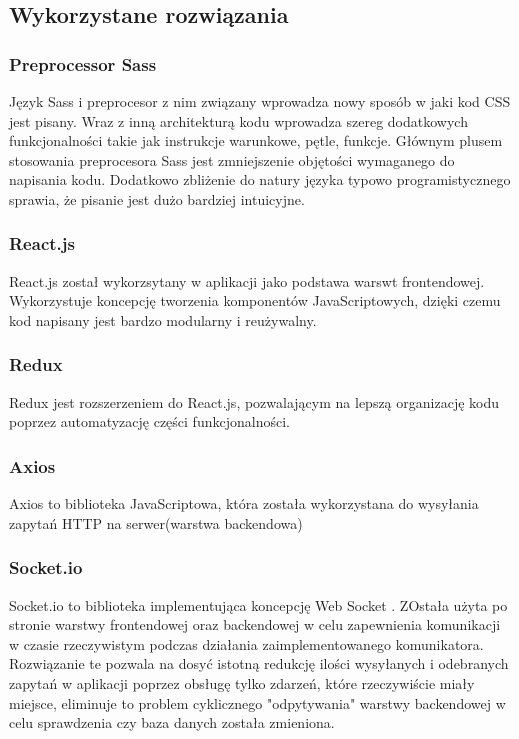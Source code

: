 \documentclass[eng,printmode]{mgr}
\begin{document}
\subsection{Wykorzystane rozwiązania}

\subsubsection{Preprocessor Sass}
Język Sass i preprocesor z nim związany \cite {SASS} wprowadza nowy sposób w jaki kod CSS jest pisany. Wraz z inną architekturą kodu wprowadza szereg dodatkowych funkcjonalności takie jak instrukcje warunkowe, pętle, funkcje. Głównym plusem stosowania preprocesora Sass jest zmniejszenie objętości wymaganego do napisania kodu. Dodatkowo zbliżenie do natury języka typowo programistycznego sprawia, że pisanie jest dużo bardziej intuicyjne.

\subsubsection{React.js}
React.js \cite {React} został wykorzsytany w aplikacji jako podstawa warswt frontendowej. Wykorzystuje koncepcję tworzenia komponentów JavaScriptowych, dzięki czemu kod napisany jest bardzo modularny i reużywalny.

\subsubsection{Redux}
Redux \cite {Redux} jest rozszerzeniem do React.js, pozwalającym na lepszą organizację kodu poprzez automatyzację części funkcjonalności.

\subsubsection{Axios}
Axios \cite {Axios} to biblioteka JavaScriptowa, która została wykorzystana do wysyłania zapytań HTTP na serwer(warstwa backendowa)

\subsubsection{Socket.io}
Socket.io \cite {Socket.io} to biblioteka implementująca koncepcję Web Socket \cite {web_socket}. ZOstała użyta po stronie warstwy frontendowej oraz backendowej w celu zapewnienia komunikacji w czasie rzeczywistym podczas działania zaimplementowanego komunikatora. Rozwiązanie te pozwala na dosyć istotną redukcję ilości wysyłanych i odebranych zapytań w aplikacji poprzez obsługę tylko zdarzeń, które rzeczywiście miały miejsce, eliminuje to problem cyklicznego "odpytywania" warstwy backendowej w celu sprawdzenia czy baza danych została zmieniona.
\end{document}
